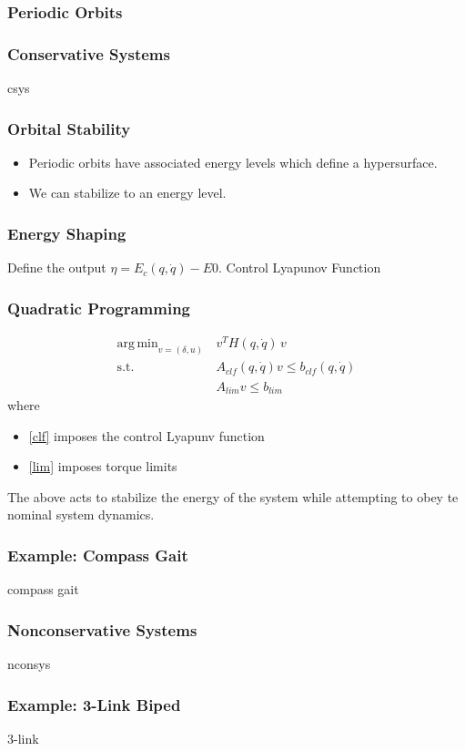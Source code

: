 \documentclass{beamer}
\DeclareMathOperator*{\argmin}{arg\,min}
\begin{document}
\begin{frame}
  \frametitle{Periodic Orbits}
\end{frame}

\begin{frame}
  \frametitle{Conservative Systems}
  csys
\end{frame}

\begin{frame}
  \frametitle{Orbital Stability}
  \begin{itemize}
  \item Periodic orbits have associated energy levels which define a hypersurface.
  \item We can stabilize to an energy level.
  \end{itemize}
\end{frame}


\begin{frame}
  \frametitle{Energy Shaping}
  Define the output $\eta = E_{c}(q, \dot q) - E0$.
  Control Lyapunov Function
\end{frame}

\begin{frame}
  \frametitle{Quadratic Programming}
  \begin{align}
    \nonumber
    \argmin_{v = (\delta, u)}  \, &v^T \! H(q, \dot q) \, v\\
    \label{clf} \tag{clf}
    \mbox{s.t. } & A_{\mathit{clf}}(q, \dot q) v \leq b_{\mathit{clf}}(q, \dot q)\\
    \label{lim} \tag{lim}
    & A_{\mathit{lim}} v \leq b_{\mathit{lim}}
  \end{align}
  where
  \begin{itemize}
  \item\eqref{clf} imposes the control Lyapunv function
  \item\eqref{lim} imposes torque limits
  \end{itemize}
  The above acts to stabilize the energy of the system while attempting to obey te nominal system dynamics.
\end{frame}

\begin{frame}
  \frametitle{Example: Compass Gait}
  compass gait
\end{frame}

\begin{frame}
  \frametitle{Nonconservative Systems}
  nconsys
\end{frame}

\begin{frame}
  \frametitle{Example: 3-Link Biped}
  3-link
\end{frame}
\end{document}
